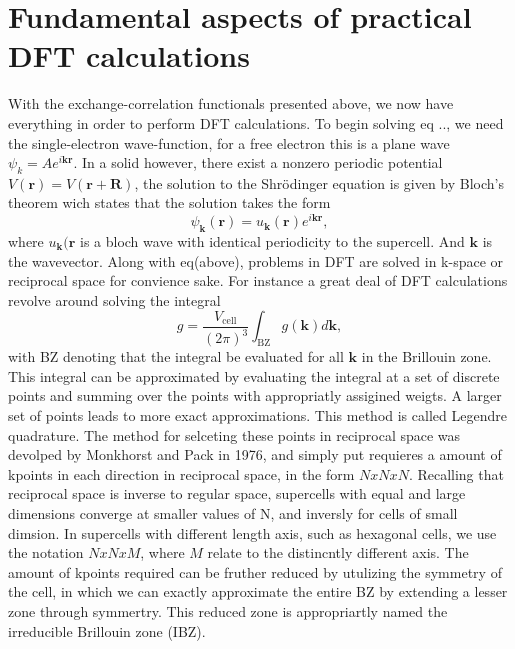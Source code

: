 \section{Fundamental aspects of practical DFT calculations}
With the exchange-correlation functionals presented above, we now have everything in order to perform DFT calculations. To begin solving eq .., we need the single-electron wave-function, for a free electron this is a plane wave $\psi_k = Ae^{i\boldsymbol{k}\boldsymbol{r}}$. In a solid however, there exist a nonzero periodic potential $V(\boldsymbol{r}) = V(\boldsymbol{r} + \boldsymbol{R})$, the solution to the Shr\"{o}dinger equation is given by Bloch's theorem wich states that the solution takes the form
\begin{equation}
\psi_{\boldsymbol{k}}(\boldsymbol{r}) = u_{\boldsymbol{k}}(\boldsymbol{r})e^{i\boldsymbol{k}\boldsymbol{r}},    
\end{equation}
where $u_{\boldsymbol{k}}(\boldsymbol{r}$ is a bloch wave with identical periodicity to the supercell. And $\boldsymbol{k}$ is the wavevector. Along with eq(above), problems in DFT are solved in k-space or reciprocal space for convience sake. For instance a great deal of DFT calculations revolve around solving the integral 
\begin{equation}
    g = \frac{V_{\text{cell}}}{(2\pi)^3} \int_{\text{BZ}} g(\boldsymbol{k})d\boldsymbol{k},
\end{equation}
with BZ denoting that the integral be evaluated for all $\boldsymbol{k}$ in the Brillouin zone. This integral can be approximated by evaluating the integral at a set of discrete points and summing over the points with appropriatly assigined weigts. A larger set of points leads to more exact approximations. This method is called Legendre quadrature. The method for selceting these points in reciprocal space was devolped by Monkhorst and Pack in 1976, and simply put requieres a amount of kpoints in each direction in reciprocal space, in the form $N x N x N$. Recalling that reciprocal space is inverse to regular space, supercells with equal and large dimensions converge at smaller values of N, and inversly for cells of small dimsion. In supercells with different length axis, such as hexagonal cells, we use the notation $N x N x M$, where $M$ relate to the distincntly different axis. The amount of kpoints required can be fruther reduced by utulizing the symmetry of the cell, in which we can exactly approximate the entire BZ by extending a lesser zone through symmertry. This reduced zone is appropriartly named the irreducible Brillouin zone (IBZ). 

